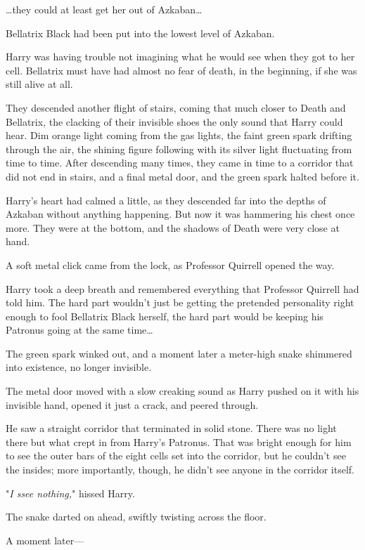 {\ldots}they could at least get her out of Azkaban{\ldots}

Bellatrix Black had been put into the lowest level of Azkaban.

Harry was having trouble not imagining what he would see when they got to her 
cell. Bellatrix must have had almost no fear of death, in the beginning, if she 
was still alive at all.

They descended another flight of stairs, coming that much closer to Death and 
Bellatrix, the clacking of their invisible shoes the only sound that Harry 
could hear. Dim orange light coming from the gas lights, the faint green spark 
drifting through the air, the shining figure following with its silver light 
fluctuating from time to time.
\sbreak
After descending many times, they came in time to a corridor that did not end 
in stairs, and a final metal door, and the green spark halted before it.

Harry's heart had calmed a little, as they descended far into the depths of 
Azkaban without anything happening. But now it was hammering his chest once 
more. They were at the bottom, and the shadows of Death were very close at hand.

A soft metal click came from the lock, as Professor Quirrell opened the way.

Harry took a deep breath and remembered everything that Professor Quirrell had 
told him. The hard part wouldn't just be getting the pretended personality 
right enough to fool Bellatrix Black herself, the hard part would be keeping 
his Patronus going at the same time{\ldots}

The green spark winked out, and a moment later a meter-high snake shimmered 
into existence, no longer invisible.

The metal door moved with a slow creaking sound as Harry pushed on it with his 
invisible hand, opened it just a crack, and peered through.

He saw a straight corridor that terminated in solid stone. There was no light 
there but what crept in from Harry's Patronus. That was bright enough for him 
to see the outer bars of the eight cells set into the corridor, but he couldn't 
see the insides; more importantly, though, he didn't see anyone in the corridor 
itself.

"\emph{I ssee nothing,}" hissed Harry.

The snake darted on ahead, swiftly twisting across the floor.

A moment later---

